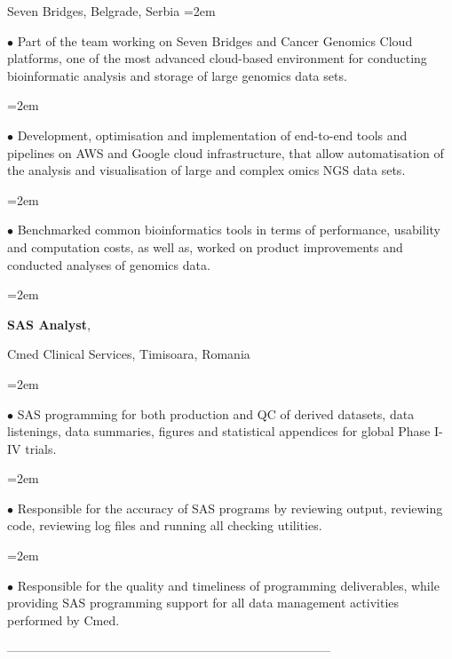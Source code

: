 \documentclass{scrartcl}
\newcommand{\MarginText}[1]{\marginpar{\raggedleft\itshape\small#1}} %
\newcommand{\Description}[1]{\hangindent=2em\hangafter=0\noindent\raggedright\footnotesize{#1}\par\normalsize\vspace{1em}} %
\begin{document}
\begin{cv}{}
{Seven Bridges, Belgrade, Serbia }
\Description{$\bullet$  Part of the team working on Seven Bridges and Cancer Genomics Cloud platforms, one of the most advanced cloud-based environment for conducting bioinformatic analysis and storage of large genomics data sets. }
\vspace{-10pt}
\Description{$\bullet$ Development, optimisation and implementation of end-to-end tools and pipelines on AWS and Google cloud infrastructure, that allow automatisation of the analysis and visualisation of large and complex omics NGS data sets. }
\vspace{-10pt}
\Description{$\bullet$ Benchmarked common bioinformatics tools in terms of performance, usability and computation costs, as well as, worked on product improvements and conducted analyses of genomics data. }
\Description{\MarginText{08/2009-08/2010}\textbf{SAS Analyst}, 

Cmed Clinical Services, Timisoara, Romania}
\Description{$\bullet$ SAS programming for both production and QC of derived datasets, data listenings, data summaries, figures and statistical appendices for global Phase I-IV trials.}
\vspace{-10pt}
\Description{$\bullet$ Responsible for the accuracy of SAS programs by reviewing output, reviewing code, reviewing log files and running all checking utilities. }
\vspace{-10pt}
\Description{$\bullet$ Responsible for the quality and timeliness of programming deliverables, while providing SAS programming support for all data management activities performed by Cmed. }

\vspace{1em}
\vspace{1em}

\vspace{-0.5em} 


------------------------------------------------------------------------------


\end{cv}
\end{document}
